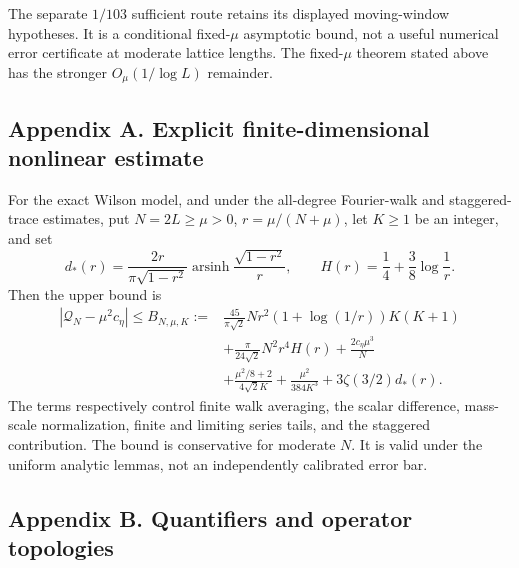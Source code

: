 \documentclass[
  10pt,
  a4paper,
]{article}
\begin{document}
The separate \(1/103\) sufficient route retains its displayed moving-window hypotheses. It is a conditional fixed-\(\mu\) asymptotic bound, not a useful numerical error certificate at moderate lattice lengths. The fixed-\(\mu\) theorem stated above has the stronger \(O_\mu(1/\log L)\) remainder.

\subsection{Appendix A. Explicit finite-dimensional nonlinear estimate}\label{app:errors}

For the exact Wilson model, and under the all-degree Fourier-walk and staggered-trace estimates, put \(N=2L\ge\mu>0\), \(r=\mu/(N+\mu)\), let \(K\ge1\) be an integer, and set \[d_*(r)=\frac{2r}{\pi\sqrt{1-r^2}}\operatorname{arsinh}\frac{\sqrt{1-r^2}}r,
\qquad H(r)=\frac14+\frac38\log\frac1r.\] Then the upper bound is \[\begin{aligned}
\label{eq:explicit}
|\mathcal Q_N-\mu^2c_\eta|\le B_{N,\mu,K}:={}&\frac{45}{\pi\sqrt2}Nr^2(1+\log(1/r))K(K+1)\nonumber\\
&+\frac{\pi}{24\sqrt2}N^2r^4H(r)+\frac{2c_\eta\mu^3}{N}\nonumber\\
&+\frac{\mu^2/8+2}{4\sqrt2 K}+\frac{\mu^2}{384K^3}
+3\zeta(3/2)d_*(r).
\end{aligned}\] The terms respectively control finite walk averaging, the scalar difference, mass-scale normalization, finite and limiting series tails, and the staggered contribution. The bound is conservative for moderate \(N\). It is valid under the uniform analytic lemmas, not an independently calibrated error bar.

\subsection{Appendix B. Quantifiers and operator topologies}\label{app:quant}
\end{document}
